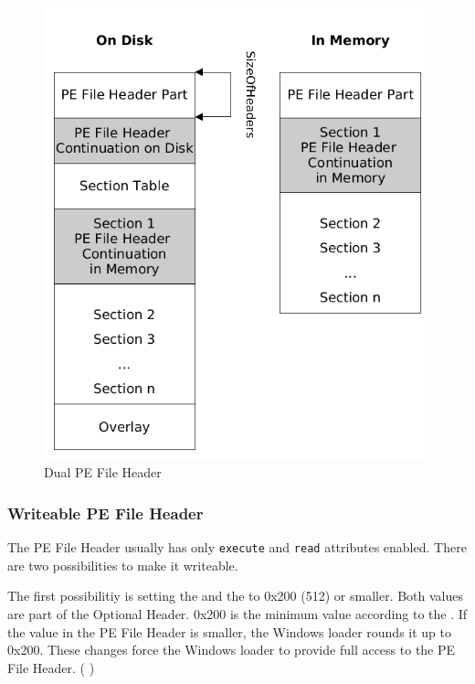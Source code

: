 \begin{figure}
\includegraphics[width=.98\textwidth, height=.60\textheight,keepaspectratio]{graphics/dualpeheader}
\caption{Dual PE File Header}
\label{fig:dualpeheader} 
\end{figure}

\subsubsection*{Writeable PE File Header} \label{subsubsec:writeableheader}

The PE File Header usually has only \texttt{execute} and \texttt{read} attributes enabled. There are two possibilities to make it writeable. 

The first possibilitiy is setting the  and the  to 0x200 (512) or smaller. Both values are part of the Optional Header. 0x200 is the minimum value according to the \PECOFF{} \cite[]{pespec}. If the value in the PE File Header is smaller, the Windows loader rounds it up to 0x200.
These changes force the Windows loader to provide full access to the PE File Header. (\cf{} \cite[]{revlabs11})

